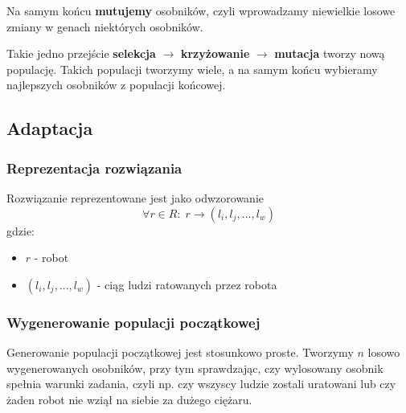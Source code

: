 \documentclass[12pt]{article}
\begin{document}
Na samym końcu \textbf{mutujemy} osobników, czyli wprowadzamy niewielkie losowe zmiany w genach niektórych osobników.

Takie jedno przejście \textbf{selekcja} $\rightarrow$ \textbf{krzyżowanie} $\rightarrow$ \textbf{mutacja} tworzy nową populację. Takich populacji tworzymy wiele, a na samym końcu wybieramy najlepszych osobników z populacji końcowej.

\subsection{Adaptacja}

\subsubsection{Reprezentacja rozwiązania}
Rozwiązanie reprezentowane jest jako odwzorowanie
\[\forall r \in R: \; r \rightarrow (l_i,l_j,...,l_w)\]
gdzie:
\begin{itemize}
    \item $r$ - robot
    \item $(l_i,l_j,...,l_w)$ - ciąg ludzi ratowanych przez robota
\end{itemize}

\subsubsection{Wygenerowanie populacji początkowej}
Generowanie populacji początkowej jest stosunkowo proste. Tworzymy $n$ losowo wygenerowanych osobników, przy tym sprawdzając, czy wylosowany osobnik spełnia warunki zadania, czyli np. czy wszyscy ludzie zostali uratowani lub czy żaden robot nie wziął na siebie za dużego ciężaru.
\end{document}
